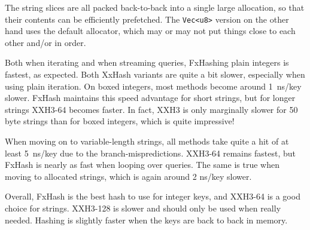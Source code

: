 \documentclass[a4paper,UKenglish,cleveref,thm-restate]{lipics-v2021}
\begin{document}
The string slices are all packed back-to-back into a single large allocation, so
that their contents can be efficiently prefetched. The \texttt{Vec<u8>} version on the
other hand uses the default allocator, which may or may not put things close to
each other and/or in order.

Both when iterating and when streaming queries, FxHashing plain integers is
fastest, as expected. Both XxHash variants are quite a bit slower, especially
when using plain iteration. On boxed integers, most methods become around 1~ns/key slower.
FxHash maintains this speed advantage for short strings, but for longer strings
XXH3-64 becomes faster. In fact, XXH3 is only marginally slower for 50 byte
strings than for boxed integers, which is quite impressive!

When moving on to variable-length strings, all methods take quite a hit of at
least 5~ns/key due to the branch-mispredictions.
XXH3-64 remains fastest, but FxHash is nearly as fast when looping over queries.
The same is true when moving to allocated strings, which is again around 2
ns/key slower.

Overall, FxHash is the best hash to use for integer keys, and XXH3-64 is a good
choice for strings. XXH3-128 is slower and should only be used when really needed.
Hashing is slightly faster when the keys are back to back in memory.
\end{document}
